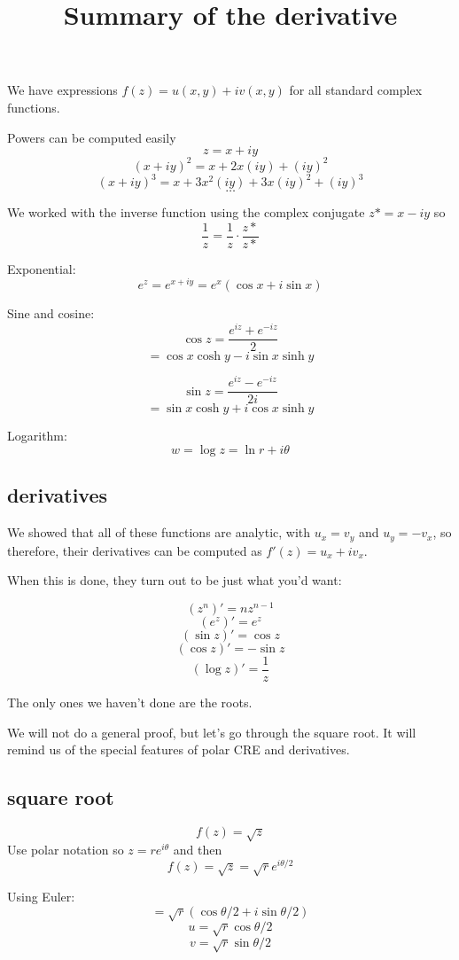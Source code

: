 \documentclass[11pt, oneside]{article}
\title{Summary of the derivative}
\date{}
\begin{document}
\maketitle
\Large


We have expressions $f(z) = u(x,y) + i v(x,y)$  for all standard complex functions.

Powers can be computed easily 
\[ z = x + iy \]
\[ (x + iy)^2 = x + 2x(iy) + (iy)^2 \]
\[ (x + iy)^3 = x + 3x^2(iy) + 3x(iy)^2 + (iy)^3 \]
\[ \dots \]

We worked with the inverse function using the complex conjugate $z* = x - iy$ so
\[ \frac{1}{z} = \frac{1}{z} \cdot \frac{z*}{z*} \]

Exponential:
\[ e^z = e^{x + iy} = e^x (\cos x + i \sin x) \]

Sine and cosine:
\[ \cos z = \frac{e^{iz} + e^{-iz}}{2} \]
\[ = \cos x \cosh y - i \sin x \sinh y \]

\[ \sin z = \frac{e^{iz} - e^{-iz}}{2i} \]
\[ = \sin x \cosh y + i \cos x \sinh y \]

Logarithm:
\[ w = \log z = \ln r + i \theta \]

\subsection*{derivatives}

We showed that all of these functions are analytic, with $u_x = v_y$ and $u_y = - v_x$, so therefore, their derivatives can be computed as $f'(z) = u_x + i v_x$.

When this is done, they turn out to be just what you'd want:

\[ (z^n)' = n z^{n-1} \]
\[ (e^z)' = e^z \]
\[ (\sin z)' = \cos z \]
\[ (\cos z)' = - \sin z \]
\[ (\log z)' = \frac{1}{z} \]

The only ones we haven't done are the roots.  

We will not do a general proof, but let's go through the square root.  It will remind us of the special features of polar CRE and derivatives.

\subsection*{square root}
\[ f(z) = \sqrt{z} \]
Use polar notation so $z = re^{i \theta}$ and then
\[ f(z) = \sqrt{z} =  \sqrt{r} e^{i \theta/2} \]

Using Euler:
\[ = \sqrt{r}(\cos \theta/2 + i \sin \theta/2) \]
\[ u = \sqrt{r} \cos \theta/2 \]
\[ v = \sqrt{r} \sin \theta/2 \]
\end{document}
